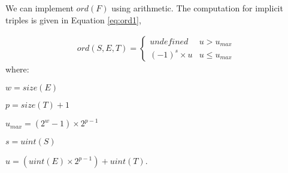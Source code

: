 \documentclass[letterpaper,10pt]{article}
\begin{document}
% 
% 

We can implement $ord(F)$ using arithmetic. The computation for implicit triples is given in Equation \ref{eq:ord1},

\begin{align} \label{eq:ord1}
 ord(S, E, T) = 
 \begin{cases}
  undefined       & u > u_{max}\\
  (-1)^s \times u & u \leq u_{max}
 \end{cases}
\end{align}
where:
\begin{description}
 \item $w = size(E)$
 \item $p = size(T) + 1$
 \item $u_{max} = (2^w-1) \times 2^{p-1}$
 \item $s = uint(S)$
 \item $u = (uint(E) \times 2^{p-1}) + uint(T)$.
\end{description}
\end{document}
